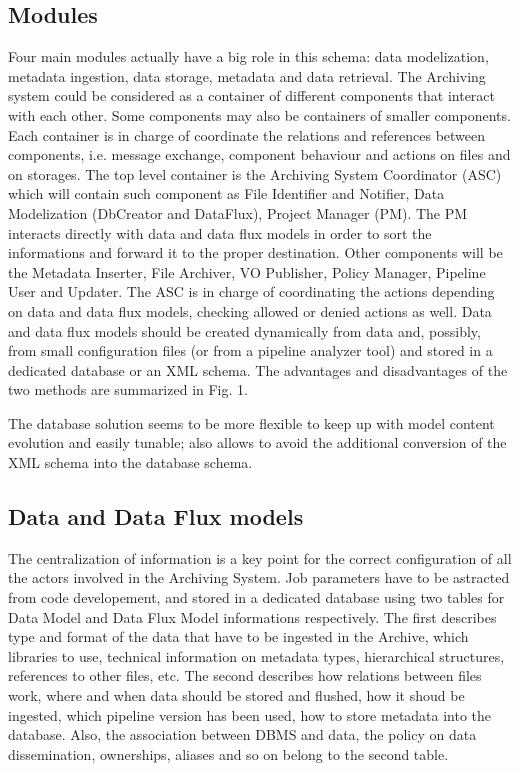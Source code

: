 \subsection{Modules}
Four main modules actually have a big role in this schema: data modelization,
metadata ingestion, data storage, metadata and data retrieval.
The Archiving system could be considered as a container of different components
that interact with each other. Some components may also be containers of smaller
components. Each container is in charge of coordinate the relations and references
between components, i.e. message exchange, component behaviour and actions on
files and on storages. The top level container is the Archiving System Coordinator
(ASC) which will contain such component as File Identifier and Notifier, Data
Modelization (DbCreator and DataFlux), Project Manager (PM). The PM interacts
directly with data and data flux models in order to sort the informations and
forward it to the proper destination. Other components will be the  Metadata
Inserter, File Archiver, VO Publisher, Policy Manager, Pipeline User and Updater.
The ASC is in charge of coordinating the actions depending on data and data flux
models, checking allowed or denied actions as well. Data and data flux models should
be created dynamically from data and, possibly, from small configuration files (or
from a pipeline analyzer tool) and stored in a dedicated database
or an XML schema. The advantages and disadvantages of the two methods are
summarized in Fig. 1.


The database solution seems to be more flexible to keep up with model content
evolution and easily tunable; also allows to avoid the additional conversion
of the XML schema into the database schema.

\subsection{Data and  Data Flux models}
The centralization of information is a key point for the correct configuration of
all the actors involved in the Archiving System. Job parameters have to be astracted
from code developement, and stored in a dedicated database using two tables for Data
Model and Data Flux Model informations respectively. The first describes type and
format of the data that have to be ingested in the Archive, which libraries to use,
technical information on metadata types, hierarchical structures, references to other
files, etc. The second describes how relations between files work, where and when data
should be stored and flushed, how it shoud be ingested, which pipeline version has
been used, how to store metadata into the database. Also, the association between
DBMS and data, the policy on data dissemination, ownerships, aliases and so on belong
to the second table.

